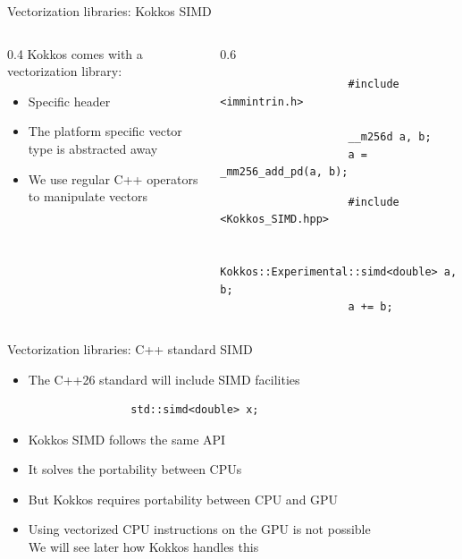 \documentclass[
    aspectratio=169,
    \createHandout
]{beamer}
\begin{document}
\begin{frame}[fragile]{Vectorization libraries: Kokkos SIMD}
    \begin{columns}
        \begin{column}{0.4\linewidth}
            Kokkos comes with a vectorization library: 
            \begin{itemize}
                \item Specific header
                \item The platform specific vector type is abstracted away
                \item We use regular C++ operators to manipulate vectors
            \end{itemize}
        \end{column}
        \begin{column}{0.6\linewidth}
            \begin{center}
                \caption{AVX2}
                \begin{verbatim}
                    #include <immintrin.h>

                    __m256d a, b;
                    a = _mm256_add_pd(a, b);
                \end{verbatim}
            \end{center}
            \begin{center}
                \caption{Kokkos SIMD}
                \begin{verbatim}
                    #include <Kokkos_SIMD.hpp>

                    Kokkos::Experimental::simd<double> a, b;
                    a += b;
                \end{verbatim}
            \end{center}
        \end{column}
    \end{columns}
\end{frame}

\begin{frame}[fragile]{Vectorization libraries: C++ standard SIMD}
    \begin{itemize}
        \item The C++26 standard will include SIMD facilities
            \begin{verbatim}
                std::simd<double> x;
            \end{verbatim}
        \item Kokkos SIMD follows the same API
        \item It solves the portability between CPUs
        \item But Kokkos requires portability between CPU and GPU
        \item Using vectorized CPU instructions on the GPU is not possible \\
              We will see later how Kokkos handles this
    \end{itemize}
\end{frame}
\end{document}
